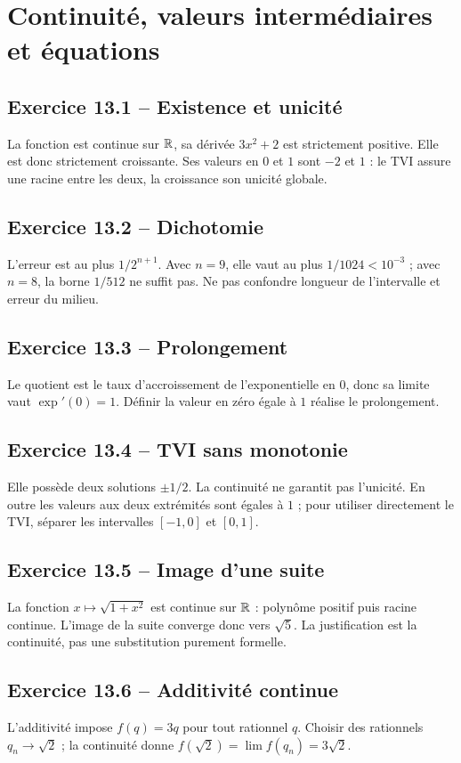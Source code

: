 \chapter{Continuité, valeurs intermédiaires et équations}
\section*{Exercice 13.1 -- Existence et unicité}
La fonction est continue sur $\mathbb{R}$, sa dérivée $3x^2+2$ est strictement positive. Elle est donc strictement croissante. Ses valeurs en $0$ et $1$ sont $-2$ et $1$ : le TVI assure une racine entre les deux, la croissance son unicité globale.

\section*{Exercice 13.2 -- Dichotomie}
L'erreur est au plus $1/2^{n+1}$. Avec $n=9$, elle vaut au plus $1/1024<10^{-3}$ ; avec $n=8$, la borne $1/512$ ne suffit pas. Ne pas confondre longueur de l'intervalle et erreur du milieu.

\section*{Exercice 13.3 -- Prolongement}
Le quotient est le taux d'accroissement de l'exponentielle en $0$, donc sa limite vaut $\exp'(0)=1$. Définir la valeur en zéro égale à $1$ réalise le prolongement.

\section*{Exercice 13.4 -- TVI sans monotonie}
Elle possède deux solutions $\pm1/2$. La continuité ne garantit pas l'unicité. En outre les valeurs aux deux extrémités sont égales à $1$ ; pour utiliser directement le TVI, séparer les intervalles $[-1,0]$ et $[0,1]$.

\section*{Exercice 13.5 -- Image d’une suite}
La fonction $x\mapsto\sqrt{1+x^2}$ est continue sur $\mathbb{R}$ : polynôme positif puis racine continue. L'image de la suite converge donc vers $\sqrt5$. La justification est la continuité, pas une substitution purement formelle.

\section*{Exercice 13.6 -- Additivité continue}
L'additivité impose $f(q)=3q$ pour tout rationnel $q$. Choisir des rationnels $q_n\to\sqrt2$ ; la continuité donne $f(\sqrt2)=\lim f(q_n)=3\sqrt2$.

